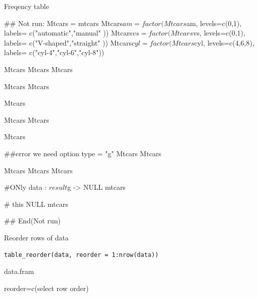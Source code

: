 \documentclass[a4paper]{book}
\begin{document}
%
\begin{Value}
Freqency table
\end{Value}
%
\begin{Examples}
\begin{ExampleCode}
## Not run: 
Mtcars = mtcars
Mtcars$am = factor(Mtcars$am, levels=c(0,1), labels= c("automatic","manual" ))
Mtcars$vs  = factor(Mtcars$vs, levels=c(0,1), labels= c("V-shaped","straight" ))
Mtcars$cyl  = factor(Mtcars$cyl, levels=c(4,6,8), labels= c("cyl-4","cyl-6","cyl-8"))

Mtcars %
Mtcars %
Mtcars %

Mtcars %
Mtcars %

Mtcars %

Mtcars %
Mtcars %

Mtcars %

##error we need option  type = "g"
Mtcars %
Mtcars %

Mtcars %
Mtcars %
Mtcars %

#ONly data : $result  $g -> NULL
 mtcars %

# this NULL
mtcars %

## End(Not run)



\end{ExampleCode}
\end{Examples}
%
\begin{Description}
Reorder rows of data
\end{Description}
%
\begin{Usage}
\begin{verbatim}
table_reorder(data, reorder = 1:nrow(data))
\end{verbatim}
\end{Usage}
%
\begin{Arguments}
\begin{ldescription}
\item[\code{data}] data.fram

\item[\code{reorder}] reorder=c(select row order)
\end{ldescription}
\end{Arguments}
\end{document}
